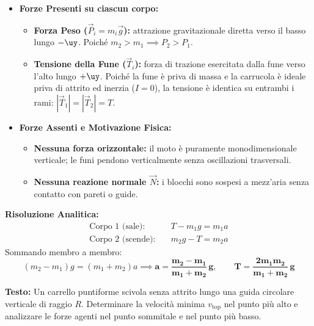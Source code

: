 \begin{tcolorbox}[enhanced, breakable, colback=forestgreen!5!white, colframe=forestgreen!80!black,
    title={\textbf{Analisi delle Forze in Gioco per la Macchina di Atwood}}, fonttitle=\bfseries\sffamily]
\begin{itemize}
    \item \textbf{Forze Presenti su ciascun corpo:}
    \begin{itemize}
        \item \textbf{Forza Peso ($\vec{P}_i = m_i\vec{g}$):} attrazione gravitazionale diretta verso il basso lungo $-\uy$. Poiché $m_2 > m_1 \implies P_2 > P_1$.
        \item \textbf{Tensione della Fune ($\vec{T}_i$):} forza di trazione esercitata dalla fune verso l'alto lungo $+\uy$. Poiché la fune è priva di massa e la carrucola è ideale priva di attrito ed inerzia ($I=0$), la tensione è identica su entrambi i rami: $|\vec{T}_1| = |\vec{T}_2| = T$.
    \end{itemize}
    \item \textbf{Forze Assenti e Motivazione Fisica:}
    \begin{itemize}
        \item \textbf{Nessuna forza orizzontale:} il moto è puramente monodimensionale verticale; le funi pendono verticalmente senza oscillazioni trasversali.
        \item \textbf{Nessuna reazione normale $\vec{N}$:} i blocchi sono sospesi a mezz'aria senza contatto con pareti o guide.
    \end{itemize}
\end{itemize}
\end{tcolorbox}

\textbf{Risoluzione Analitica:}
\begin{align}
    \text{Corpo 1 (sale):} \quad & T - m_1 g = m_1 a \label{eq:atwood_1_fbd} \\
    \text{Corpo 2 (scende):} \quad & m_2 g - T = m_2 a \label{eq:atwood_2_fbd}
\end{align}
Sommando membro a membro:
\begin{equation}
    (m_2 - m_1)g = (m_1 + m_2)a \implies \mathbf{a = \frac{m_2 - m_1}{m_1 + m_2}\,g}, \qquad \mathbf{T = \frac{2 m_1 m_2}{m_1 + m_2}\,g}
\end{equation}

\vspace{0.8em}

\begin{esercizio}
\textbf{Testo:}
Un carrello puntiforme scivola senza attrito lungo una guida circolare verticale di raggio $R$. Determinare la velocità minima $v_{\text{top}}$ nel punto più alto e analizzare le forze agenti nel punto sommitale e nel punto più basso.
\end{esercizio}

